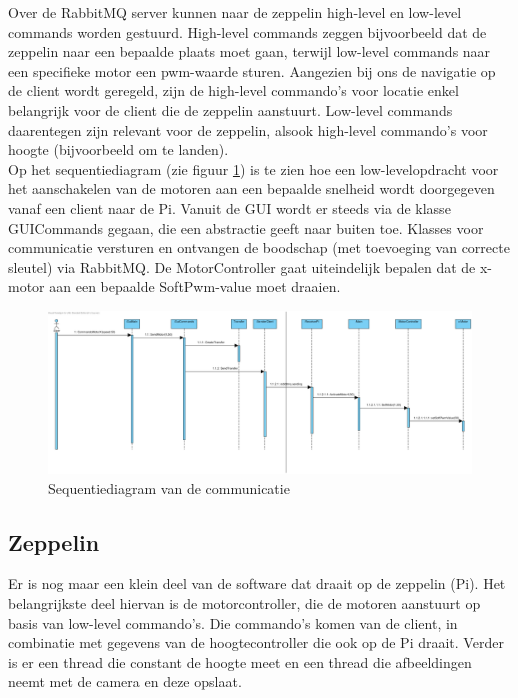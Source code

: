 \documentclass[eind]{penoverslag}
\begin{document}
Over de RabbitMQ server kunnen naar de zeppelin high-level en low-level commands worden gestuurd. High-level commands zeggen bijvoorbeeld dat de zeppelin naar een bepaalde plaats moet gaan, terwijl low-level commands naar een specifieke motor een pwm-waarde sturen. Aangezien bij ons de navigatie op de client wordt geregeld, zijn de high-level commando's voor locatie enkel belangrijk voor de client die de zeppelin aanstuurt. Low-level commands daarentegen zijn relevant voor de zeppelin, alsook high-level commando's voor hoogte (bijvoorbeeld om te landen). \\

Op het sequentiediagram (zie figuur \ref{Sequence}) is te zien hoe een low-levelopdracht voor het aanschakelen van de motoren aan een bepaalde snelheid wordt doorgegeven vanaf een client naar de Pi. Vanuit de GUI wordt er steeds via de klasse GUICommands gegaan, die een abstractie geeft naar buiten toe. Klasses voor communicatie versturen en ontvangen de boodschap (met toevoeging van correcte sleutel) via RabbitMQ. De MotorController gaat uiteindelijk bepalen dat de x-motor aan een bepaalde SoftPwm-value moet draaien.
\\

\begin{figure}[H]
\begin{center}
\includegraphics[width=1\textwidth]{PiToClientCommunication.png}
\end{center}
\caption{Sequentiediagram van de communicatie}
\label{Sequence}
\end{figure} 

\subsection{Zeppelin}
Er is nog maar een klein deel van de software dat draait op de zeppelin (Pi). Het belangrijkste deel hiervan is de motorcontroller, die de motoren aanstuurt op basis van low-level commando's. Die commando's komen van de client, in combinatie met gegevens van de hoogtecontroller die ook op de Pi draait. Verder is er een thread die constant de hoogte meet en een thread die afbeeldingen neemt met de camera en deze opslaat. \\
\end{document}

